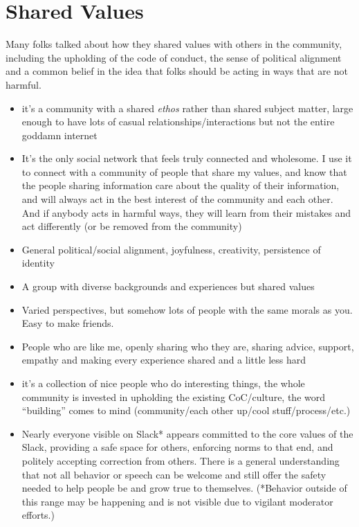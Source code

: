 \documentclass[
]{book}
\providecommand{\tightlist}{%
  \setlength{\itemsep}{0pt}\setlength{\parskip}{0pt}}
\begin{document}
\section{Shared Values}\label{shared-values}

Many folks talked about how they shared values with others in the community, including the upholding of the code of conduct, the sense of political alignment and a common belief in the idea that folks should be acting in ways that are not harmful.

\begin{itemize}
\tightlist
\item
  it's a community with a shared \emph{ethos} rather than shared subject matter, large enough to have lots of casual relationships/interactions but not the entire goddamn internet
\item
  It's the only social network that feels truly connected and wholesome. I use it to connect with a community of people that share my values, and know that the people sharing information care about the quality of their information, and will always act in the best interest of the community and each other. And if anybody acts in harmful ways, they will learn from their mistakes and act differently (or be removed from the community)
\item
  General political/social alignment, joyfulness, creativity, persistence of identity
\item
  A group with diverse backgrounds and experiences but shared values
\item
  Varied perspectives, but somehow lots of people with the same morals as you. Easy to make friends.
\item
  People who are like me, openly sharing who they are, sharing advice, support, empathy and making every experience shared and a little less hard
\item
  it's a collection of nice people who do interesting things, the whole community is invested in upholding the existing CoC/culture, the word ``building'' comes to mind (community/each other up/cool stuff/process/etc.)
\item
  Nearly everyone visible on Slack* appears committed to the core values of the Slack, providing a safe space for others, enforcing norms to that end, and politely accepting correction from others. There is a general understanding that not all behavior or speech can be welcome and still offer the safety needed to help people be and grow true to themselves. (*Behavior outside of this range may be happening and is not visible due to vigilant moderator efforts.)

\end{itemize}
\end{document}
